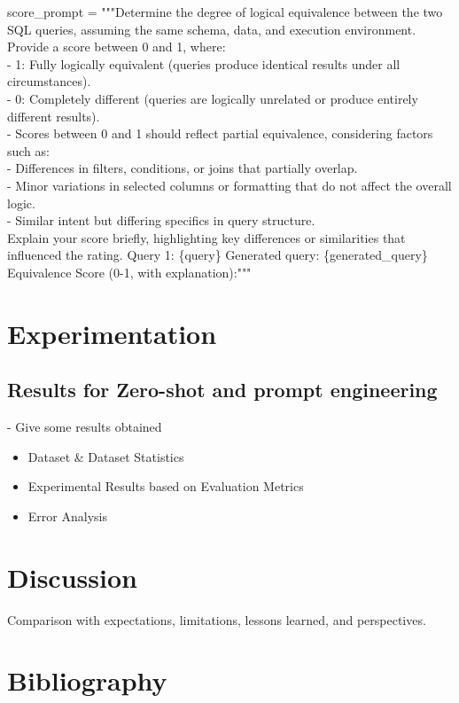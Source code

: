 \documentclass[12pt,a4paper]{article}
\begin{document}
score\_prompt = """Determine the degree of logical equivalence between the two SQL queries, assuming the same schema, data, and execution environment. Provide a score between 0 and 1, where:
\\
- 1: Fully logically equivalent (queries produce identical results under all circumstances).
\\
- 0: Completely different (queries are logically unrelated or produce entirely different results).
\\
- Scores between 0 and 1 should reflect partial equivalence, considering factors such as:
\\
- Differences in filters, conditions, or joins that partially overlap.
\\
- Minor variations in selected columns or formatting that do not affect the overall logic.
\\
- Similar intent but differing specifics in query structure.
\\
Explain your score briefly, highlighting key differences or similarities that influenced the rating.
Query 1:
\{query\}
Generated query:
\{generated\_query\}
Equivalence Score (0-1, with explanation):"""






\section*{Experimentation}
\subsection*{Results for Zero-shot and prompt engineering}

- Give some results obtained


\begin{itemize}
\item Dataset \& Dataset Statistics
\item Experimental Results based on Evaluation Metrics
\item Error Analysis
\end{itemize}

\section*{Discussion}

Comparison with expectations, limitations, lessons learned, and perspectives.

\section*{Bibliography}


\end{document}
